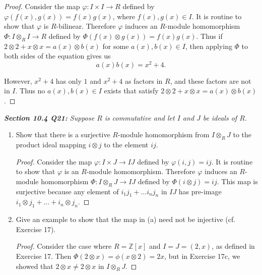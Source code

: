 \documentclass{article}
\begin{document}
  \begin{proof}
    Consider the map $\varphi:I\times I\rightarrow R$ defined by
    $\varphi(f(x),g(x))=f(x)g(x)$, where $f(x),g(x)\in I$. It is
    routine to show that $\varphi$ is $R$-bilinear. Therefore $\varphi$
    induces an $R$-module homomorphism $\Phi:I\otimes_RI\rightarrow R$
    defined by $\Phi(f(x)\otimes g(x))=f(x)g(x)$. Thus if
    $2\otimes2+x\otimes x=a(x)\otimes b(x)$ for some
    $a(x),b(x)\in I$, then applying $\Phi$ to both sides of the equation
    gives us
    \[a(x)b(x)=x^2+4.\]

    However, $x^2+4$ has only $1$ and $x^2+4$ as factors in $R$, and these
    factors are not in $I$. Thus no $a(x),b(x)\in I$ exists that satisfy
    $2\otimes2+x\otimes x=a(x)\otimes b(x)$.
  \end{proof}

\it \textbf{Section 10.4 Q21:} Suppose $R$ is commutative and let $I$ and
  $J$ be ideals of $R$.
  \begin{enumerate}[label={(\alph*)}]
    \item Show that there is a surjective $R$-module homomorphism from
      $I\otimes_RJ$ to the product ideal mapping $i\otimes j$ to the
      element $ij$.

      \begin{proof}
        Consider the map $\varphi:I\times J\rightarrow IJ$ defined by
        $\varphi(i,j)=ij$. It is routine to show that $\varphi$ is an
        $R$-module homomorphism. Therefore $\varphi$ induces an $R$-module
        homomorphism $\Phi:I\otimes_RJ\rightarrow IJ$ defined by
        $\Phi(i\otimes j)=ij$. This map is surjective because any element
        of $i_1j_1+\ldots i_nj_n$ in $IJ$ has pre-image $i_1\otimes
        j_1+\ldots+i_n\otimes j_n$.
      \end{proof}

    \item Give an example to show that the map in (a) need not be
      injective (cf. Exercise 17).

      \begin{proof}
        Consider the case where $R=\mathbb{Z}[x]$ and $I=J=(2,x)$, as
        defined in Exercise 17. Then $\Phi(2\otimes x)=\phi(x\otimes2)=2x$,
        but in Exercise 17c, we showed that $2\otimes x\neq 2\otimes x$ in
        $I\otimes_RJ$.
      \end{proof}
  \end{enumerate}
\end{document}
